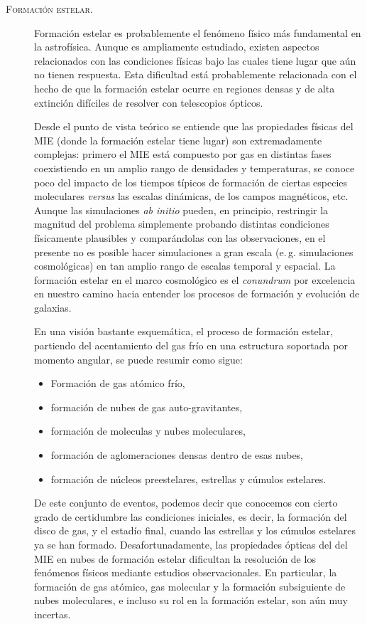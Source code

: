 \documentclass{article}
\begin{document}
\begin{description}
%
\item[\textsc{Formación estelar.}] Formación estelar es probablemente el fenómeno físico más
fundamental en la astrofísica. Aunque es ampliamente estudiado, existen aspectos relacionados con
las condiciones físicas bajo las cuales tiene lugar que aún no tienen respuesta. Esta dificultad
está probablemente relacionada con el hecho de que la formación estelar ocurre en regiones densas y
de alta extinción difíciles de resolver con telescopios ópticos.

Desde el punto de vista teórico se entiende que las propiedades físicas del MIE (donde la formación
estelar tiene lugar) son extremadamente complejas: primero el MIE está compuesto por gas en
distintas fases coexistiendo en un amplio rango de densidades y temperaturas, se conoce poco del
impacto de los tiempos típicos de formación de ciertas especies moleculares \emph{versus} las
escalas dinámicas, de los campos magnéticos, etc. Aunque las simulaciones \emph{ab initio} pueden,
en principio, restringir la magnitud del problema simplemente probando distintas condiciones
físicamente plausibles y comparándolas con las observaciones, en el presente no es posible hacer
simulaciones a gran escala (e.\,g. simulaciones cosmológicas) en tan amplio rango de escalas
temporal y espacial. La formación estelar en el marco cosmológico es el \emph{conundrum} por
excelencia en nuestro camino hacia entender los procesos de formación y evolución de galaxias.

En una visión bastante esquemática, el proceso de formación estelar, partiendo del acentamiento del
gas frío en una estructura soportada por momento angular, se puede resumir como sigue:
\begin{itemize}
\item Formación de gas atómico frío,
\item formación de nubes de gas auto-gravitantes,
\item formación de moleculas y nubes moleculares,
\item formación de aglomeraciones densas dentro de esas nubes,
\item formación de núcleos preestelares, estrellas y cúmulos estelares.
\end{itemize}
De este conjunto de eventos, podemos decir que conocemos con cierto grado de certidumbre las
condiciones iniciales, es decir, la formación del disco de gas, y el estadío final, cuando las
estrellas y los cúmulos estelares ya se han formado. Desafortunadamente, las propiedades ópticas del
del MIE en nubes de formación estelar dificultan la resolución de los fenómenos físicos mediante
estudios observacionales. En particular, la formación de gas atómico, gas molecular y la formación
subsiguiente de nubes moleculares, e incluso su rol en la formación estelar, son aún muy incertas.


\end{description}
\end{document}
